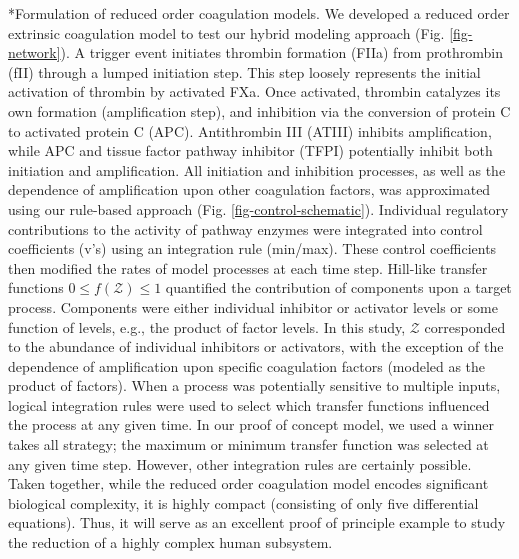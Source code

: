 \documentclass[12pt]{article}
\makeatletter
\renewcommand\subsection{\@startsection
	{subsection}{2}{0mm}
	{-0.05in}
	{-0.5\baselineskip}
	{\normalfont\normalsize\bfseries}}
\makeatother
\begin{document}


\subsection*{Formulation of reduced order coagulation models.}
We developed a reduced order extrinsic coagulation model to test our hybrid modeling approach (Fig. \ref{fig-network}).
A trigger event initiates thrombin formation (FIIa) from prothrombin (fII) through a lumped initiation step.
This step loosely represents the initial activation of thrombin by activated FXa.
Once activated, thrombin catalyzes its own formation (amplification step), and inhibition via the conversion of protein C to activated protein C (APC).
Antithrombin III (ATIII) inhibits amplification, while APC and tissue factor pathway inhibitor (TFPI) potentially inhibit both initiation and amplification. 
All initiation and inhibition processes, as well as the dependence of amplification upon other coagulation factors, was approximated using our rule-based approach (Fig. \ref{fig-control-schematic}). 
Individual regulatory contributions to the activity of pathway enzymes were integrated into control coefficients (v's) using an integration rule (min/max).  
These control coefficients then modified the rates of model processes at each time step.
Hill-like transfer functions $0 \leq f\left(\mathcal{Z}\right) \leq 1$ quantified the contribution of components upon a target process. 
Components were either individual inhibitor or activator levels or some function of levels, e.g., the product of factor levels. 
In this study, $\mathcal{Z}$ corresponded to the abundance of individual inhibitors or activators, 
with the exception of the dependence of amplification upon specific coagulation factors (modeled as the product of factors). 
When a process was potentially sensitive to multiple inputs, logical integration rules were used to select which transfer functions influenced the process at any given time. 
In our proof of concept model, we used a winner takes all strategy; the maximum or minimum transfer function was selected at any given time step. 
However, other integration rules are certainly possible. 
Taken together, while the reduced order coagulation model encodes significant biological complexity, it is highly compact (consisting of only five differential equations). 
Thus, it will serve as an excellent proof of principle example to study the reduction of a highly complex human subsystem.  
\end{document}
